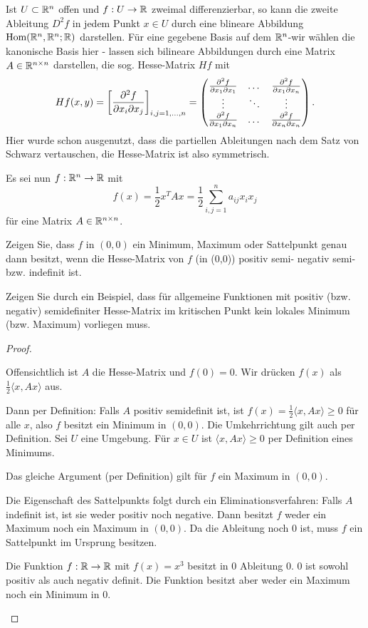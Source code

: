 \begin{Problem}
	Ist $U\subset \mathbb{R}^n$ offen und $f:U\to \mathbb{R}$ zweimal differenzierbar, so kann die zweite Ableitung $D^2f$ in jedem Punkt $x\in U$ durch eine blineare Abbildung $\text{Hom}(\mathbb{R}^n,\mathbb{R}^n;\mathbb{R})$ darstellen. F\"{u}r eine gegebene Basis auf dem $\mathbb{R}^n$-wir wählen die kanonische Basis hier - lassen sich bilineare Abbildungen durch eine Matrix $A\in \mathbb{R}^{n\times n}$ darstellen, die sog. Hesse-Matrix $Hf$ mit
	\[
		Hf(x,y)=\left[ \pdv[2]{f}{x_i}{x_j}(x) \right]_{i,j=1,\dots, n}=\begin{pmatrix} \pdv[2]{f}{x_1}{x_1} & \dots & \pdv[2]{f}{x_1}{x_n} \\ \vdots & \ddots & \vdots \\ \pdv[2]{f}{x_1}{x_n} & \dots & \pdv[2]{f}{x_n}{x_n}\end{pmatrix} 
	.\] 
Hier wurde schon ausgenutzt, dass die partiellen Ableitungen nach dem Satz von Schwarz vertauschen, die Hesse-Matrix ist also symmetrisch.

Es sei nun $f:\mathbb{R}^n\to \mathbb{R}$ mit
\[
	f(x)=\frac{1}{2}x^T Ax=\frac{1}{2}\sum_{i,j=1}^n a_{ij}x_i x_j
\]
f\"{u}r eine Matrix $A\in \mathbb{R}^{n\times n}$.
\begin{parts}
	\item Zeigen Sie, dass $f$ in $(0,0)$ ein Minimum, Maximum oder Sattelpunkt genau dann besitzt, wenn die Hesse-Matrix von $f$ (in (0,0)) positiv semi- negativ semi- bzw. indefinit ist. 
	\item Zeigen Sie durch ein Beispiel, dass für allgemeine Funktionen mit positiv (bzw. negativ) semidefiniter Hesse-Matrix im kritischen Punkt kein lokales Minimum (bzw. Maximum) vorliegen muss.  
\end{parts}
\end{Problem}
\begin{proof}
	\begin{parts}
	\item Offensichtlich ist $A$ die Hesse-Matrix und $f(0)=0$. Wir drücken $f(x)$ als $\frac{1}{2}\langle x, Ax\rangle$ aus.

	Dann per Definition: Falls $A$ positiv semidefinit ist, ist $f(x)=\frac{1}{2}\langle x, Ax\rangle\ge 0$ f\"{u}r alle $x$, also $f$ besitzt ein Minimum in $(0,0)$. Die Umkehrrichtung gilt auch per Definition. Sei $U$ eine Umgebung. F\"{u}r $x\in U$ ist $\langle x, Ax\rangle \ge 0$ per Definition eines Minimums. 

	Das gleiche Argument (per Definition) gilt f\"{u}r $f$ ein Maximum in $(0,0)$.

	Die Eigenschaft des Sattelpunkts folgt durch ein Eliminationsverfahren: Falls $A$ indefinit ist, ist sie weder positiv noch negative. Dann besitzt $f$ weder ein Maximum noch ein Maximum in $(0,0)$. Da die Ableitung noch $0$ ist, muss $f$ ein Sattelpunkt im Ursprung besitzen.
\item Die Funktion $f:\mathbb{R}\to\mathbb{R}$ mit $f(x)=x^3$ besitzt in $0$ Ableitung $0$. $0$ ist sowohl positiv als auch negativ definit. Die Funktion besitzt aber weder ein Maximum noch ein Minimum in $0$.
\end{parts}
\end{proof}
